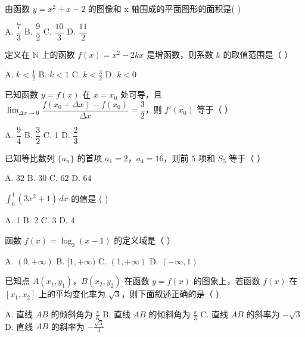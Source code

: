 \documentclass[11pt, a4paper]{article}
\begin{document}
\begin{baitap}[8]
由函数 $y = x^2 + x - 2$ 的图像和 x 轴围成的平面图形的面积是( )
\par\vspace{3pt}
\noindent A. $\dfrac{7}{3}$ \quad B. $\dfrac{9}{2}$ \quad C. $\dfrac{10}{3}$ \quad D. $\dfrac{11}{2}$
\end{baitap}

\begin{baitap}[9]
定义在 $\mathbb{N}$ 上的函数 $f(x)=x^2-2kx$ 是增函数，则系数 $k$ 的取值范围是（ ）
\par\vspace{3pt}
\noindent A. $k<\frac{1}{2}$ \quad B. $k<1$ \quad C. $k<\frac{3}{2}$ \quad D. $k<0$
\end{baitap}

\begin{baitap}[10]
已知函数 $y = f(x)$ 在 $x = x_0$ 处可导，且 $\lim_{\Delta x \to 0} \dfrac{f(x_0 + \Delta x) - f(x_0)}{\Delta x} = \dfrac{3}{2}$，则 $f'(x_0)$ 等于（ ）
\par\vspace{3pt}
\noindent A. $\dfrac{9}{4}$ \quad B. $\dfrac{3}{2}$ \quad C. 1 \quad D. $\dfrac{2}{3}$
\end{baitap}

\begin{baitap}[11]
已知等比数列 $\{a_n\}$ 的首项 $a_1 = 2$，$a_4 = 16$，则前 $5$ 项和 $S_5$ 等于（ ）
\par\vspace{3pt}
\noindent A. $32$ \quad B. $30$ \quad C. $62$ \quad D. $64$
\end{baitap}

\begin{baitap}[12]
$\int_0^1 (3x^2 + 1)\,dx$ 的值是 ( )
\par\vspace{3pt}
\noindent A. 1 \quad B. 2 \quad C. 3 \quad D. 4
\end{baitap}

\begin{baitap}[13]
函数 $f(x) = \log_2(x - 1)$ 的定义域是（ ）
\par\vspace{3pt}
\noindent A. $(0, +\infty)$ \quad B. $[1, +\infty)$ \quad C. $(1, +\infty)$ \quad D. $(-\infty, 1)$
\end{baitap}

\begin{baitap}[14]
已知点 $A(x_1,y_1)$，$B(x_2,y_2)$ 在函数 $y=f(x)$ 的图象上，若函数 $f(x)$ 在 $[x_1,x_2]$ 上的平均变化率为 $\sqrt{3}$，则下面叙述正确的是（ ）
\par\vspace{3pt}
\noindent A. 直线 $AB$ 的倾斜角为 $\frac{\pi}{6}$ \quad B. 直线 $AB$ 的倾斜角为 $\frac{\pi}{3}$ \quad C. 直线 $AB$ 的斜率为 $-\sqrt{3}$ \quad D. 直线 $AB$ 的斜率为 $-\frac{\sqrt{3}}{3}$
\end{baitap}
\end{document}
